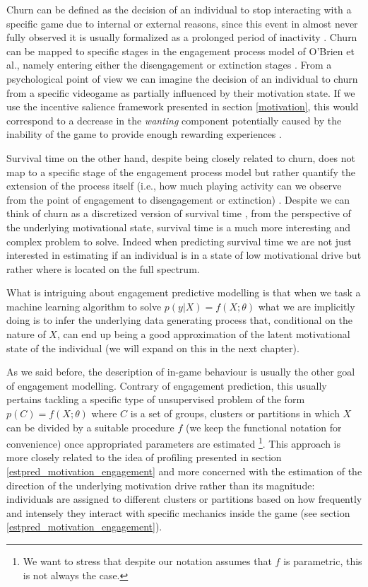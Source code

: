 Churn can be defined as the decision of an individual to stop interacting with a specific game due to internal or external reasons, since this event in almost never fully observed it is usually formalized as a prolonged period of inactivity \cite{hadiji2014predicting,runge2014churn, drachen2016rapid,milovsevic2017early, kim2017churn}. Churn can be mapped to specific stages in the engagement process model of O'Brien et al., namely entering either the disengagement or extinction stages \cite{o2008user}. From a psychological point of view we can imagine the decision of an individual to churn from a specific videogame as partially influenced by their motivation state. If we use the incentive salience framework presented in section \ref{motivation}, this would correspond to a decrease in the \textit{wanting} component potentially caused by the inability of the game to provide enough rewarding experiences \cite{berridge2004motivation}. 

Survival time on the other hand, despite being closely related to churn, does not map to a specific stage of the engagement process model but rather quantify the extension of the process itself (i.e., how much playing activity can we observe from the point of engagement to disengagement or extinction) \cite{perianez2016churn, demediuk2018player, bertens2017games, kim2017churn, viljanen2018playtime}. Despite we can think of churn as a discretized version of survival time \cite{el2021game}, from the perspective of the underlying motivational state, survival time is a much more interesting and complex problem to solve. Indeed when predicting survival time we are not just interested in estimating  if an individual is in a state of low motivational drive but rather where is located on the full spectrum. 

What is intriguing about engagement predictive modelling is that when we task a machine learning algorithm to solve $p(y|X) = f(X; \theta)$ what we are implicitly doing is to infer the underlying data generating process that, conditional on the nature of $X$, can end up being a good approximation of the latent motivational state of the individual (we will expand on this in the next chapter). 

As we said before, the description of in-game behaviour is usually the other goal of engagement modelling. Contrary of engagement prediction, this usually pertains tackling a specific type of unsupervised problem of the form $p(C) = f(X; \theta)$ where $C$ is a set of groups, clusters or partitions in which $X$ can be divided by a suitable procedure $f$ (we keep the functional notation for convenience) once appropriated parameters are estimated \cite{bishop2006pattern} \footnote{We want to stress that despite our notation assumes that $f$ is parametric, this is not always the case.}. This approach is more closely related to the idea of profiling presented in section \ref{estpred_motivation_engagement} and more concerned with the estimation of the direction of the underlying motivation drive rather than its magnitude: individuals are assigned to different clusters or partitions based on how frequently and intensely they interact with specific mechanics inside the game (see section \ref{estpred_motivation_engagement}). 

